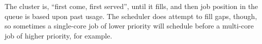 The cluster is, ``first come, first served'', until it fills, and then job
position in the queue is based upon past usage. The scheduler does attempt
to fill gaps, though, so sometimes a single-core job of lower priority
will schedule before a multi-core job of higher priority, for example.